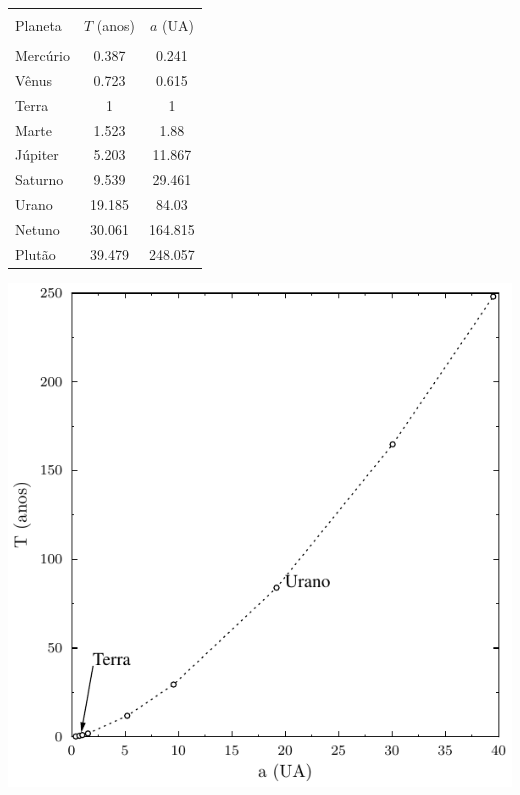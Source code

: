 \documentclass[a4paper]{article}
\begin{document}
\begin{resolucoes}
\begin{exercicio}
\begin{compactenum}[(a)]
  \noindent
  \begin{minipage}[c]{0.45\textwidth}
    \begin{center}
      \begin{tabular}{lcc}
      \toprule\\
      Planeta & $T$ (anos) & $a$ (UA)\\
      \midrule\\
      Mercúrio & 0.387 &0.241\\
      Vênus & 0.723 & 0.615\\
      Terra & 1 &1\\
      Marte & 1.523 &1.88\\
      Júpiter & 5.203 &11.867\\
      Saturno & 9.539 & 29.461\\
      Urano & 19.185 & 84.03\\
      Netuno & 30.061 & 164.815\\
      Plutão & 39.479 & 248.057\\
      \bottomrule
      \end{tabular}
    \end{center}
  \end{minipage}\hfill
  \begin{minipage}[c]{0.45\textwidth}
    \includegraphics[width=\textwidth]{Txa_planetas_Sistema_Solar}
  \end{minipage}
  

\end{compactenum}
\end{exercicio}
\end{resolucoes}
\end{document}
